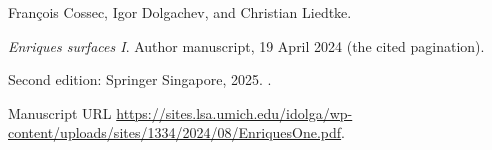 Fran\c{c}ois Cossec, Igor Dolgachev, and Christian Liedtke.

\newblock \emph{Enriques surfaces {I}}. Author manuscript, 19 April 2024
  (the cited pagination).

\newblock Second edition: Springer Singapore, 2025.
  .

\newblock Manuscript URL
  \url{https://sites.lsa.umich.edu/idolga/wp-content/uploads/sites/1334/2024/08/EnriquesOne.pdf}.

